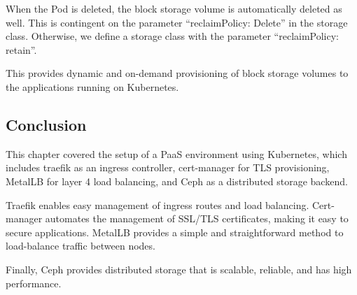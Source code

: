 When the Pod is deleted, the block storage volume is automatically deleted as well. This is contingent on the parameter “reclaimPolicy: Delete” in the storage class. Otherwise, we define a storage class with the parameter “reclaimPolicy: retain”. 

This provides dynamic and on-demand provisioning of block storage volumes to the applications running on Kubernetes. 

\subsection*{Conclusion}

This chapter covered the setup of a PaaS environment using Kubernetes, which includes traefik as an ingress controller, cert-manager for TLS provisioning, MetalLB for layer 4 load balancing, and Ceph as a distributed storage backend. 

Traefik enables easy management of ingress routes and load balancing. Cert-manager automates the management of SSL/TLS certificates, making it easy to secure applications. MetalLB provides a simple and straightforward method to load-balance traffic between nodes. 

Finally, Ceph provides distributed storage that is scalable, reliable, and has high performance. 